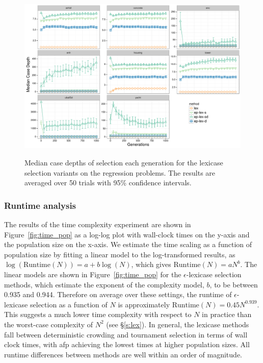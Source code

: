 \documentclass[twoside]{article}
\begin{document}
\begin{figure}[htb]
\centering
  \includegraphics[width=\textwidth]{figs/median_case_depth.pdf}\\
 \caption{Median case depths of selection each generation for the lexicase selection variants on the regression problems. The results are averaged over 50 trials with 95\% confidence intervals. } 
\label{fig:case_depth}
\end{figure}

\label{tbl:tables===}




\subsubsection{Runtime analysis}

The results of the time complexity experiment are shown in Figure~\ref{fig:time_pop} as a log-log plot with wall-clock times on the y-axis and the population size on the x-axis. We estimate the time scaling as a function of population size by fitting a linear model to the log-transformed results, as $\log(\text{Runtime}(N)) = a + b \log(N)$, which gives $\text{Runtime}(N) = a N^b$. The linear models are shown in Figure~\ref{fig:time_pop} for the $\epsilon$-lexicase selection methods, which estimate the exponent of the complexity model, $b$, to be between 0.935 and 0.944. Therefore on average over these settings, the runtime of $\epsilon$-lexicase selection as a function of $N$ is approximately $\text{Runtime}(N) = 0.45 N^{0.939}$. This suggests a much lower time complexity with respect to $N$ in practice than the worst-case complexity of $N^2$ (see \S\ref{s:lex}). In general, the lexicase methods fall between deterministic crowding and tournament selection in terms of wall clock times, with afp achieving the lowest times at higher population sizes. All runtime differences between methods are well within an order of magnitude. 
\end{document}
